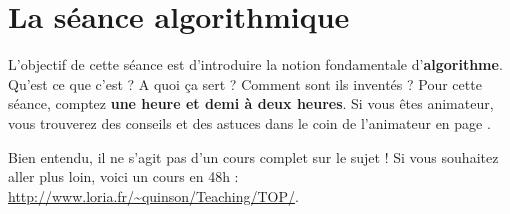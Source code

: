\documentclass[a5paper,pagesize,DIV=14]{scrbook}
\begin{document}

\section*{La séance algorithmique}

L'objectif de cette séance est d'introduire la notion fondamentale d'\textbf{al\-gorithme}. Qu'est ce que c'est ? A quoi ça sert ? Comment sont ils inventés ? Pour cette séance, comptez \textbf{une heure et demi à deux heures}. Si vous êtes animateur, vous trouverez des conseils et des astuces dans le coin de l'animateur en page \pageref{chap:coin-animateur}.

Bien entendu, il ne s'agit pas d'un cours complet sur le sujet ! Si vous souhaitez aller plus loin, voici un cours en 48h : \url{http://www.loria.fr/~quinson/Teaching/TOP/}.
\end{document}
